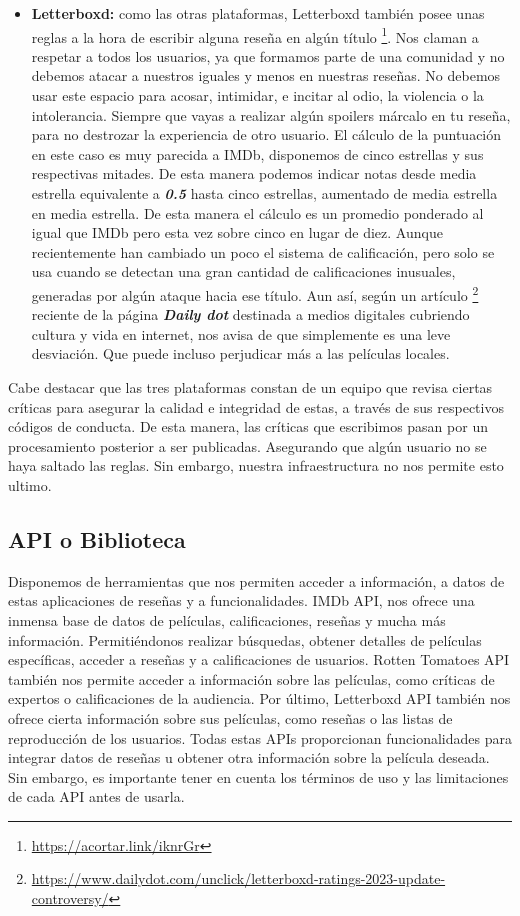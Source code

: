 \begin{itemize}
\item \textbf{Letterboxd:} como las otras plataformas, Letterboxd también posee unas reglas a la hora de escribir alguna reseña en algún título \footnote{\url{https://acortar.link/iknrGr}}. Nos claman a respetar a todos los usuarios, ya que formamos parte de una comunidad y no debemos atacar a nuestros iguales y menos en nuestras reseñas. No debemos usar este espacio para acosar, intimidar, e incitar al odio, la violencia o la intolerancia. Siempre que vayas a realizar algún spoilers márcalo en tu reseña, para no destrozar la experiencia de otro usuario. El cálculo de la puntuación en este caso es muy parecida a IMDb, disponemos de cinco estrellas y sus respectivas mitades. De esta manera podemos indicar notas desde media estrella equivalente a \textbf{\textit{0.5}} hasta cinco estrellas, aumentado de media estrella en media estrella. De esta manera el cálculo es un promedio ponderado al igual que IMDb pero esta vez sobre cinco en lugar de diez. Aunque recientemente han cambiado un poco el sistema de calificación, pero solo se usa cuando se detectan una gran cantidad de calificaciones inusuales, generadas por algún ataque hacia ese título. Aun así, según un artículo \footnote{\url{https://www.dailydot.com/unclick/letterboxd-ratings-2023-update-controversy/}} reciente de la página \textbf{\textit{Daily dot}} destinada a medios digitales cubriendo cultura y vida en internet, nos avisa de que simplemente es una leve desviación. Que puede incluso perjudicar más a las películas locales.
\end{itemize}

Cabe destacar que las tres plataformas constan de un equipo que revisa ciertas críticas para asegurar la calidad e integridad de estas, a través de sus respectivos códigos de conducta. De esta manera, las críticas que escribimos pasan por un procesamiento posterior a ser publicadas. Asegurando que algún usuario no se haya saltado las reglas. Sin embargo, nuestra infraestructura no nos permite esto ultimo.

\subsection{API o Biblioteca}

Disponemos de herramientas que nos permiten acceder a información, a datos de estas aplicaciones de 
reseñas y a funcionalidades. IMDb API, nos ofrece una inmensa base de datos de películas, 
calificaciones, reseñas y mucha más información. Permitiéndonos realizar búsquedas, obtener detalles de 
películas específicas, acceder a reseñas y a calificaciones de usuarios. Rotten Tomatoes API también 
nos permite acceder a información sobre las películas, como críticas de expertos o calificaciones de la 
audiencia. Por último, Letterboxd API también nos ofrece cierta información sobre sus películas, como 
reseñas o las listas de reproducción de los usuarios. Todas estas APIs proporcionan funcionalidades 
para integrar datos de reseñas u obtener otra información sobre la película deseada. Sin embargo, es 
importante tener en cuenta los términos de uso y las limitaciones de cada API antes de usarla.


